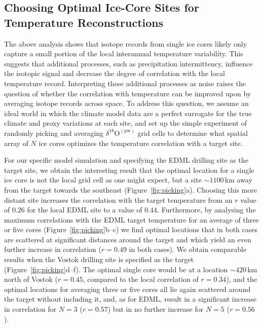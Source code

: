 \documentclass[draft]{agujournal2019}
\begin{document}
\subsection{Choosing Optimal Ice-Core Sites for Temperature Reconstructions}
\label{results:picking}

The above analysis shows that isotope records from single ice cores likely only
capture a small portion of the local interannual temperature variability. This
suggests that additional processes, such as precipitation intermittency,
influence the isotopic signal and decrease the degree of correlation with the
local temperature record. Interpreting these additional processes as noise
raises the question of whether the correlation with temperature can be improved
upon by averaging isotope records across space. To address this question, we
assume an ideal world in which the climate model data are a perfect
surrogate for the true climate and proxy variations at each site, and set up
the simple experiment of randomly picking and averaging
$\delta^{18}\mathrm{O}^{\mathrm{(pw)}}$ grid cells to determine what spatial
array of $N$ ice cores optimizes the temperature correlation with a target
site.

For our specific model simulation and specifying the EDML drilling site as the
target site, we obtain the interesting result that the optimal location for a
single ice core is not the local grid cell as one might expect, but a site
$\sim1100$\,km away from the target towards the southeast
(Figure~\ref{fig:picking}a). Choosing this more distant site increases the
correlation with the target temperature from an $r$ value of $0.26$ for the
local EDML site to a value of $0.44$. Furthermore, by analysing the maximum
correlations with the EDML target temperature for an average of three or five
cores (Figure~\ref{fig:picking}b--c) we find optimal locations that in both cases
are scattered at significant distances around the target and which yield an even
further increase in correlation ($r=0.49$ in both cases). We obtain comparable
results when the Vostok drilling site is specified as the target
(Figure~\ref{fig:picking}d--f). The optimal single core would be at a location
$\sim420$\,km north of Vostok ($r=0.45$, compared to the local correlation of
$r=0.34$), and the optimal locations for averaging three or five cores all lie
again scattered around the target without including it, and, as for EDML, result
in a significant increase in correlation for $N=3$ ($r=0.57$) but in no further
increase for $N=5$ ($r=0.56$).
\end{document}
